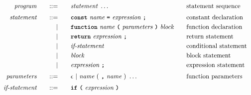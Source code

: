 







\begin{alignat*}{9}
&& \textit{program}    &&\quad ::= &\quad && \textit{statement} \ \ldots
                                                           && \textrm{statement sequence} \\[1mm]
&& \textit{statement}    &&\quad ::= &\quad && \textbf{\texttt{const}}\  \textit{name} \ 
                                           \textbf{\texttt{=}}\  \textit{expression} \ \textbf{\texttt{;}}
                                                           && \textrm{constant declaration} \\
&&                       && |   &\quad && \textbf{\texttt{function}}\  \textit{name} \ 
                                   \textbf{\texttt{(}}\  \textit{parameters} \ \textbf{\texttt{)}}\ \textit{block} \quad
                                                           && \textrm{function declaration}\\
&&                       && |   &\quad && \textbf{\texttt{return}}\  \textit{expression} \ \textbf{\texttt{;}}
                                                           && \textrm{return statement}\\
&&                       && |   &\quad && \textit{if-statement} \quad
                                                           && \textrm{conditional statement}\\
&&                       && |   &\quad &&  \textit{block} 
                                                           && \textrm{block statement}\\
&&                       && |   &\quad &&  \textit{expression} \ \textbf{\texttt{;}}
                                                           && \textrm{expression statement} \\[1mm]
&& \textit{parameters}   && ::= &\quad &&  \epsilon\ | \  \textit{name} \ 
                                                   (\ \textbf{\texttt{,}} \ \textit{name}\ )\ \ldots
                                                            && \textrm{function parameters}   \\[1mm]
&& \textit{if-statement} && ::= &\quad &&  \textbf{\texttt{if}}\
                                   \textbf{\texttt{(}}\ \textit{expression} \ \textbf{\texttt{)}}\ 

\end{alignat*}
